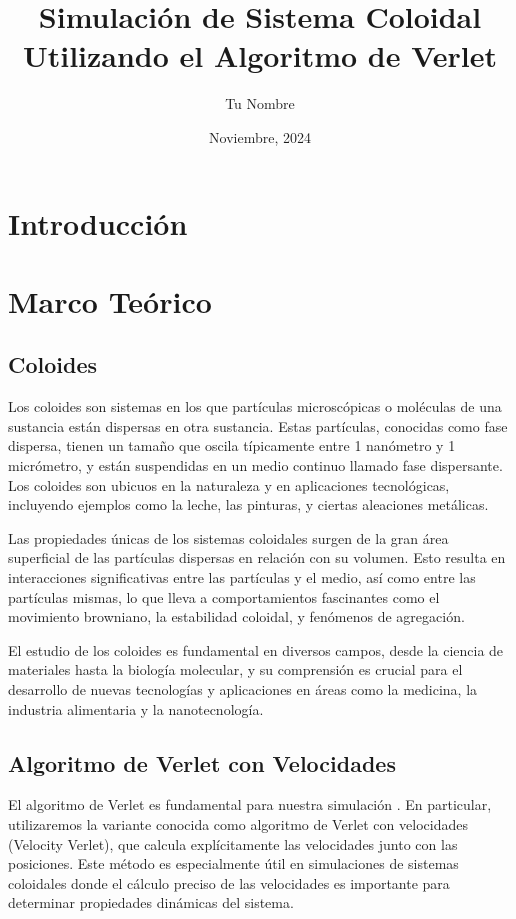 \documentclass[twocolumn]{article}
\title{Simulación de Sistema Coloidal Utilizando el Algoritmo de Verlet}
\author{Tu Nombre}
\date{Noviembre, 2024}
\begin{document}
\maketitle

\begin{abstract}
\end{abstract}

\section{Introducción}

\section{Marco Teórico}
\subsection*{Coloides}
Los coloides son sistemas en los que partículas microscópicas o moléculas de una sustancia están dispersas en otra sustancia. Estas partículas, conocidas como fase dispersa, tienen un tamaño que oscila típicamente entre 1 nanómetro y 1 micrómetro, y están suspendidas en un medio continuo llamado fase dispersante. Los coloides son ubicuos en la naturaleza y en aplicaciones tecnológicas, incluyendo ejemplos como la leche, las pinturas, y ciertas aleaciones metálicas.

Las propiedades únicas de los sistemas coloidales surgen de la gran área superficial de las partículas dispersas en relación con su volumen. Esto resulta en interacciones significativas entre las partículas y el medio, así como entre las partículas mismas, lo que lleva a comportamientos fascinantes como el movimiento browniano, la estabilidad coloidal, y fenómenos de agregación.

El estudio de los coloides es fundamental en diversos campos, desde la ciencia de materiales hasta la biología molecular, y su comprensión es crucial para el desarrollo de nuevas tecnologías y aplicaciones en áreas como la medicina, la industria alimentaria y la nanotecnología.

\subsection*{Algoritmo de Verlet con Velocidades}
El algoritmo de Verlet es fundamental para nuestra simulación \cite{verlet_wiki}. En particular, utilizaremos la variante conocida como algoritmo de Verlet con velocidades (Velocity Verlet), que calcula explícitamente las velocidades junto con las posiciones. Este método es especialmente útil en simulaciones de sistemas coloidales donde el cálculo preciso de las velocidades es importante para determinar propiedades dinámicas del sistema.
\end{document}
